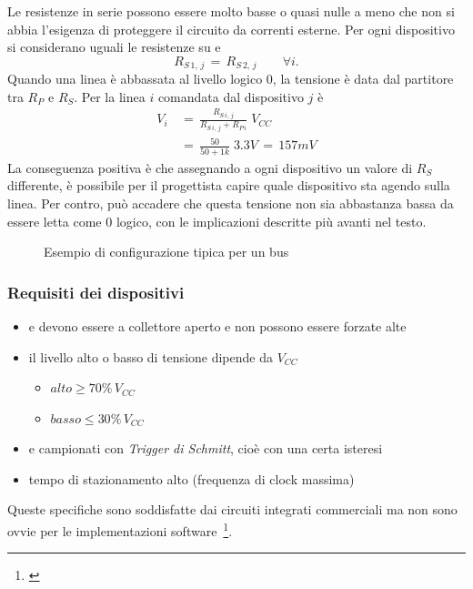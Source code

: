Le resistenze in serie possono essere molto basse o quasi nulle
a meno che non si abbia l'esigenza di proteggere il circuito da correnti esterne.
Per ogni dispositivo si considerano uguali le resistenze su {\sda} e {\scl}
\begin{equation}
	R_{S\,1,\,j}\,=\,R_{S\,2,\,j}\qquad \forall i.
\label{eqn:rs}
\end{equation}
Quando una linea è abbassata al livello logico \textsc{0},
la tensione è data dal partitore tra $R_P$ e $R_S$.
Per la linea $i$ comandata dal dispositivo $j$ è
\begin{align}
	V_{i}\,&=\,\frac{R_{S\,i,\,j}}{R_{S\,i,\,j}+R_{P\,i}}\;V_{CC} \\
    & =\,\frac{50}{50+1k}\;3.3V \,=\,157mV
\label{eqn:partitore}
\end{align}
La conseguenza positiva è che assegnando a ogni dispositivo un valore di $R_S$ differente,
è possibile per il progettista capire quale dispositivo sta agendo sulla linea.
Per contro, può accadere che questa tensione non sia abbastanza bassa da essere letta come \textsc{0} logico,
con le implicazioni descritte più avanti nel testo.

\begin{figure}
  \centering
  \resizebox{.9\linewidth}{!}{}
  \caption{Esempio di configurazione tipica per un bus \iic}
  \label{fig:i2c_tipica}
\end{figure}



\subsubsection{Requisiti dei dispositivi}
\begin{itemize}
  \item {\sda{} e \scl{} devono essere a collettore aperto e non possono essere forzate alte}
  \item {il livello alto o basso di tensione dipende da $V_{CC}$}
  \begin{itemize}
	\item {\(alto \geq 70\%\,V_{CC}\)} 
	\item {\(basso \leq 30\%\,V_{CC}\)}
  \end{itemize}
  \item {\sda{} e \scl{} campionati con \emph{Trigger di Schmitt}, cioè con una certa isteresi}
  \item {tempo di stazionamento alto (frequenza di clock massima)}
\end{itemize}
Queste specifiche sono soddisfatte dai circuiti integrati commerciali
ma non sono ovvie per le implementazioni software~\footnote{\cite{cit:primer}}.





